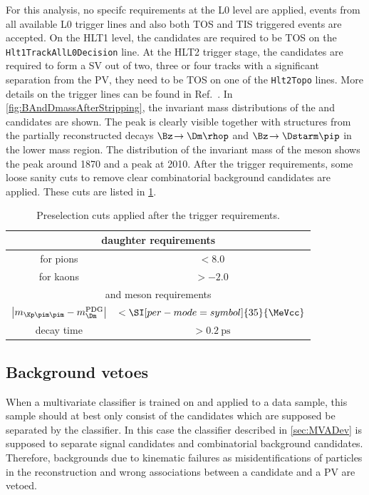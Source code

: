 For this analysis, no specifc requirements at the L0 level are applied, \ie events from all available L0 trigger lines and also both TOS and TIS triggered events are accepted.
On the HLT1 level, the \Bz candidates are required to be TOS on the \verb!Hlt1TrackAllL0Decision! line.
At the HLT2 trigger stage, the \BdToDpi candidates are required to form a \ac{SV} out of two, three or four tracks with a significant separation from the \ac{PV}, \ie they need to be TOS on one of the \verb!Hlt2Topo! lines. More details on the trigger lines can be found in Ref.~\cite{Trigger_Gligorov}.
In \cref{fig:BAndDmassAfterStripping}, the invariant mass distributions of the \Bz and \Dm candidates are shown. The \Bz peak is clearly visible together with structures from the partially reconstructed decays $\Bz\!\to\Dm\rhop$ and $\Bz\!\to\Dstarm\pip$ in the lower mass region.
The distribution of the invariant mass of the \D meson shows the \Dm peak around \SI[per-mode=symbol]{1870}{\MeVcc} and a \mbox{\Dstarm peak} at \SI[per-mode=symbol]{2010}{\MeVcc}.
After the trigger requirements, some loose sanity cuts to remove clear combinatorial background candidates are applied.
These cuts are listed in \cref{tab:preselection}.
\begin{table}[tbp]
	\centering
	\caption{Preselection cuts applied after the trigger requirements.}
	\begin{tabular}{cc}
		\toprule
		\multicolumn{2}{c}{\Dm daughter requirements}\\
		\midrule
		\dllkpi for pions	& $<8.0$ \\
		\dllkpi for kaons 	& $>-2.0$ \\
		\midrule
		\multicolumn{2}{c}{\Dm  and \Bz meson requirements}\\
		\midrule
		$\left|m_{\Kp\pim\pim}-m_\Dm^{\text{PDG}}\right|$	& $<\SI[per-mode=symbol]{35}{\MeVcc}$ \\
		\Bz decay time										& $>\SI{0.2}{\pico\second}$ \\
		\bottomrule
	\end{tabular}
	\label{tab:preselection}
\end{table}

\subsection{Background vetoes}
\label{sec:vetoes}

When a multivariate classifier is trained on and applied to a data sample, this sample should at best only consist of the candidates which are supposed be separated by the classifier.
In this case the classifier described in \cref{sec:MVADev} is supposed to separate \BdToDpi signal candidates and combinatorial background candidates.
Therefore, backgrounds due to kinematic failures as misidentifications of particles in the reconstruction and wrong associations between a \Bz candidate and a \ac{PV} are vetoed.

